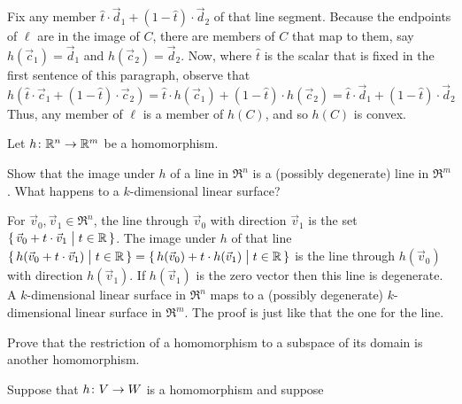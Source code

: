 \begin{exercises}
\begin{answer}
\begin{exparts}
          Fix any member $\hat{t}\cdot\vec{d}_1+(1-\hat{t})\cdot\vec{d}_2$
          of that line segment.
          Because the endpoints of $\ell$ are in the image of $C$, there are
          members of $C$ that map to them, say $h(\vec{c}_1)=\vec{d}_1$
          and $h(\vec{c}_2)=\vec{d}_2$.
          Now, where $\hat{t}$ is the scalar that is fixed in the first
          sentence of this paragraph, observe that
          $h(\hat{t}\cdot\vec{c}_1+(1-\hat{t})\cdot\vec{c}_2)
          =\hat{t}\cdot h(\vec{c}_1)+(1-\hat{t})\cdot h(\vec{c}_2)
          =\hat{t}\cdot\vec{d}_1+(1-\hat{t})\cdot\vec{d}_2$
          Thus, any member of $\ell$ is a member of $h(C)$, and so $h(C)$ is
          convex.
      \end{exparts}
    \end{answer}
  \recommended \item \label{exer:HomosPresLinStruc}
    Let \( \mbox{$h\colon \mathbb{R}^n\to \mathbb{R}^m$} \) be a homomorphism.
    \begin{exparts}
      \partsitem Show that the image under \( h \) of a line in 
        \( \Re^n \) is a (possibly degenerate) line in \( \Re^m \).
      \partsitem What happens to a \( k \)-dimensional linear surface?
    \end{exparts}
    \begin{answer}
      \begin{exparts}
        \partsitem For \( \vec{v}_0,\vec{v}_1\in\Re^n \), the line through 
          \( \vec{v}_0 \) with direction \( \vec{v}_1 \) is the set 
          $\mbox{$\{\,\vec{v}_0+t\cdot \vec{v}_1\bigm| t\in\mathbb{R}\,\}$}$.
          The image under $h$ of that line
          $\mbox{$\{\,h(\vec{v}_0+t\cdot \vec{v}_1)\bigm| t\in\mathbb{R}\,\}$}
             =\mbox{$\{\,h(\vec{v}_0)+t\cdot h(\vec{v}_1)\bigm| t\in\mathbb{R}\,\}$}$
          is the line through $h(\vec{v}_0)$ with direction $h(\vec{v}_1)$.
          If \( h(\vec{v}_1) \) is the zero vector then this line is 
          degenerate.
        \partsitem A \( k \)-dimensional linear surface in \( \Re^n \) maps to
          a (possibly degenerate) \( k \)-dimensional linear surface in
          \( \Re^m \).
          The proof is just like that the one for the line.
      \end{exparts}  
     \end{answer}
  \item 
    Prove that the restriction of a homomorphism to a subspace of its
    domain is another homomorphism.
    \begin{answer}
      Suppose that \( \mbox{$h\colon V\to W$} \) is a homomorphism and suppose

\end{answer}
\end{exercises}
